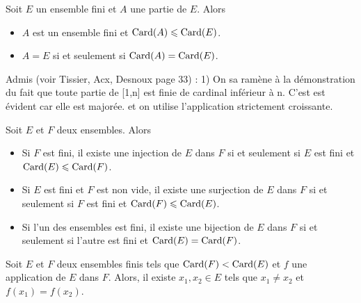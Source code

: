 \documentclass{magnolia}
\begin{document}


\begin{proposition}
Soit $E$ un ensemble fini et $A$ une partie de $E$. Alors
\begin{itemize}
\item $A$ est un ensemble fini et $\operatorname{Card}(A)\leqslant\operatorname{Card}(E)$.
\item $A=E$ si et seulement si $\operatorname{Card}(A)=\operatorname{Card}(E)$.
\end{itemize}
\end{proposition}

\begin{preuve}
Admis (voir Tissier, Acx, Desnoux page 33) :
1) On sa ramène à la démonstration du fait que toute partie de [1,n] est
   finie de cardinal inférieur à n. C'est est évident car elle est majorée.
    et on utilise l'application strictement croissante.
\end{preuve}


\begin{proposition}
Soit $E$ et $F$ deux ensembles. Alors
\begin{itemize}
\item Si $F$ est fini, il existe une injection de $E$ dans $F$ si et seulement
  si $E$ est fini et $\operatorname{Card} (E)\leqslant\operatorname{Card} (F)$.
\item Si $E$ est fini et $F$ est non vide, il existe une surjection de $E$ dans $F$ si et seulement
  si $F$ est fini et $\operatorname{Card} (F)\leqslant\operatorname{Card} (E)$.
\item Si l'un des ensembles est fini, il existe une bijection de $E$ dans $F$ si
  et seulement si l'autre est fini et $\operatorname{Card}(E)=\operatorname{Card}(F)$.
\end{itemize}
\end{proposition}

\begin{proposition}[nom={Principe des tiroirs}]
Soit $E$ et $F$ deux ensembles finis tels que $\operatorname{Card}(F)<\operatorname{Card}(E)$ et $f$ une application de $E$ dans $F$. Alors, il existe
$x_1,x_2\in E$ tels que $x_1\neq x_2$ et $f(x_1)=f(x_2)$.
\end{proposition}
\end{document}
